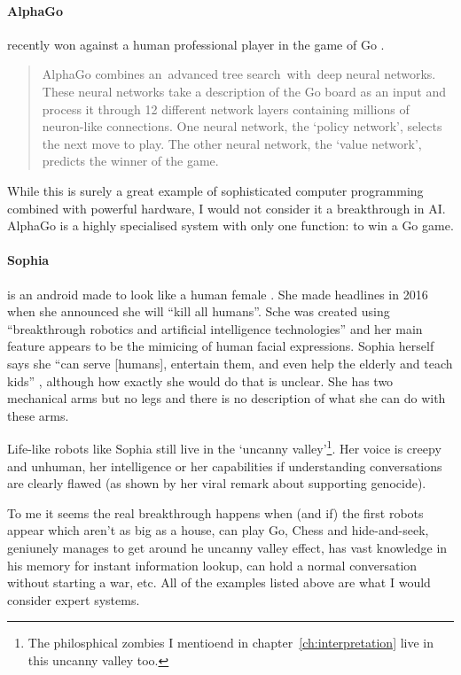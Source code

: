 \paragraph{AlphaGo} recently won against a human professional player in the game of Go \autocite{DeepMind2016,Hassabis2016}. 

\begin{quotation}
  AlphaGo combines an advanced tree search with deep neural networks. These neural networks take a description of the Go board as an input and process it through 12 different network layers containing millions of neuron-like connections. One neural network, the `policy network', selects the next move to play. The other neural network, the `value network', predicts the winner of the game. 
\end{quotation}

While this is surely a great example of sophisticated computer programming combined with powerful hardware, I would not consider it a breakthrough in \ac{AI}. AlphaGo is a highly specialised system with only one function: to win a Go game.

\paragraph{Sophia} is an android made to look like a human female \autocite{Sophia2016,Hanson2016}. She made headlines in 2016 when she announced she will ``kill all humans''. Sche was created using ``breakthrough robotics and artificial intelligence technologies'' and her main feature appears to be the mimicing of human facial expressions. Sophia herself says she ``can serve [humans], entertain them, and even help the elderly and teach kids'' \citeyear{Sophia2016}, although how exactly she would do that is unclear. She has two mechanical arms but no legs and there is no description of what she can do with these arms.

Life-like robots like Sophia still live in the `uncanny valley'\footnote{The philosphical zombies I mentioend in chapter~\ref{ch:interpretation} live in this uncanny valley too.}. Her voice is creepy and unhuman, her intelligence or her capabilities if understanding conversations are clearly flawed (as shown by her viral remark about supporting genocide).

\spirals

To me it seems the real breakthrough happens when (and if) the first robots appear which aren't as big as a house, can play Go, Chess and hide-and-seek, geniunely manages to get around he uncanny valley effect, has vast knowledge in his memory for instant information lookup, can hold a normal conversation without starting a war, etc. All of the examples listed above are what I would consider expert systems. 

